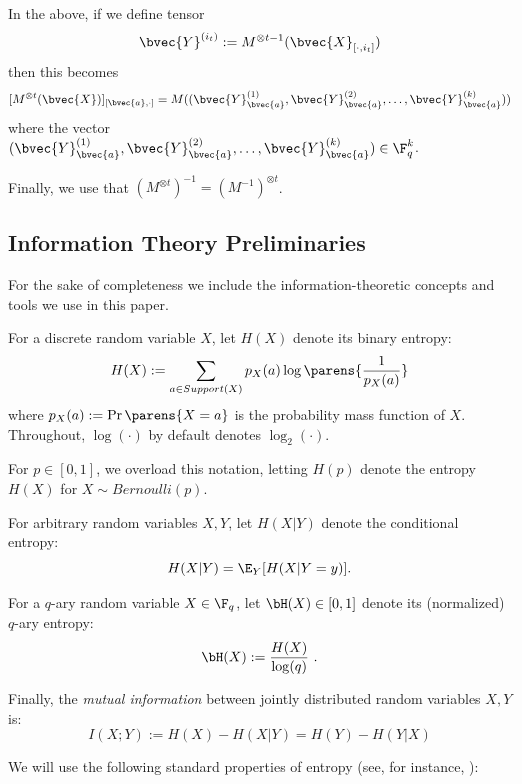 \documentclass[11pt]{article}
\begin{document}
In the above, if we define tensor
$$\bvec{Y}^{(i_t)}:= M^{\otimes t-1}(\bvec{X}_{[\cdot, i_t]})$$
then this becomes
\begin{equation}
	\label{eqn:tensor1}
	[M^{\otimes t}(\bvec{X})]_{[\bvec{a}, \cdot]}
	= M(
	(
	\bvec{Y}_{\bvec{a}}^{(1)},
	\bvec{Y}_{\bvec{a}}^{(2)},
	\dots,
	\bvec{Y}_{\bvec{a}}^{(k)}
	)
	)
\end{equation}
where the vector
$(
\bvec{Y}_{\bvec{a}}^{(1)},
\bvec{Y}_{\bvec{a}}^{(2)},
\dots,
\bvec{Y}_{\bvec{a}}^{(k)}
) \in \F_q^k$.



Finally, we use that $(M^{\otimes t})^{-1} = (M^{-1})^{\otimes t}$.

\subsection{Information Theory Preliminaries}

For the sake of completeness we include the information-theoretic concepts and tools we use in this paper.

For a discrete random variable $X$,
let $H(X)$ denote its binary entropy:
$$H(X) := \sum_{a \in Support(X)} p_X(a) \log\parens{\frac{1}{p_X(a)}}$$
where $p_X(a) := \Pr\parens{X = a}$ is the probability mass function of $X$.
Throughout, $\log(\cdot)$ by default denotes $\log_2(\cdot)$.

For $p \in [0, 1]$, we overload this notation, letting $H(p)$ denote
the entropy $H(X)$ for $X \sim Bernoulli(p)$.

For arbitrary random variables $X, Y$, let $H(X | Y)$ denote
the conditional entropy:
$$H(X | Y) = \E_{Y}[H(X | Y = y)].$$

For a $q$-ary random variable $X \in \F_q$, let
$\bH(X) \in [0, 1]$ denote its (normalized) $q$-ary entropy:
\begin{equation}
	\label{eq:normalized-entropy}
	\bH(X) := \frac{H(X)}{\log(q)} \ . 
\end{equation}

Finally, the \emph{mutual information} between jointly distributed random
variables $X, Y$ is:
$$I(X; Y) := H(X) - H(X | Y) = H(Y) - H(Y | X)$$

We will use the following standard properties of entropy (see, for instance, \cite{CoverThomas}):
\end{document}

